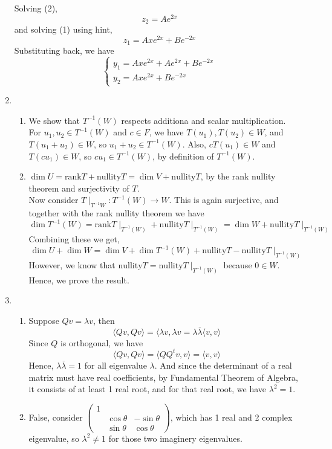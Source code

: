 \documentclass[12pt]{article}
\newcommand{\nullity}{\mathrm{nullity }}
\newcommand{\rank}{\mathrm{rank }}
\theoremstyle{definition}
\begin{document}
\begin{enumerate}
\[\]
Solving (2),
\[
z_2 = Ae^{2x}
\]
and solving (1) using hint, 
\[
z_1 = Axe^{2x}+Be^{-2x}
\]
Substituting back, we have
\[
\begin{cases}
y_1 = Axe^{2x}+Ae^{2x}+Be^{-2x}\\
y_2 = Axe^{2x}+Be^{-2x}
\end{cases}
\]
\item \begin{enumerate}
\item We show that $T^{-1}(W)$ respects additiona and scalar multiplication. \\For $u_1,u_2\in T^{-1}(W)$ and $c\in F$, we have $T(u_1),T(u_2)\in W$, and $T(u_1+u_2)\in W$, so $u_1+u_2\in T^{-1}(W)$. Also, $cT(u_1)\in W$ and $T(cu_1)\in W$, so $cu_1\in T^{-1}(W)$, by definition of $T^{-1}(W)$.
\item $\dim U = \rank T + \nullity T = \dim V + \nullity T$, by the rank nullity theorem and surjectivity of $T$.\\Now consider $T\mid_{T^{-1}W}:T^{-1}(W)\to W$. This is again surjective, and together with the rank nullity theorem we have
\[
\dim T^{-1}(W) = \rank T\mid_{T^{-1}(W)}+\nullity T\mid_{T^{-1}(W)} = \dim W +\nullity T\mid_{T^{-1}(W)}
\]
Combining these we get,
\[
\dim U + \dim W = \dim V + \dim T^{-1}(W) +\nullity T - \nullity T\mid_{T^{-1}(W)}
\]
However, we know that $\nullity T = \nullity T\mid_{T^{-1}(W)}$ because $0\in W$. Hence, we prove the result. 
\end{enumerate}
\item\begin{enumerate}
\item Suppose $Qv = \lambda v$, then
\[\langle Qv,Qv\rangle = \langle \lambda v, \lambda v =\lambda\overline{\lambda}\langle v,v\rangle
\]
Since $Q$ is orthogonal, we have
\[
\langle Qv,Qv\rangle = \langle QQ^t v,v\rangle = \langle v,v\rangle
\]
Hence, $\lambda\overline{\lambda}=1$ for all eigenvalue $\lambda$. And since the determinant of a real matrix must have real coefficients, by Fundamental Theorem of Algebra, it consists of at least 1 real root, and for that real root, we have $\lambda^2 = 1$.
\item False, consider $\begin{pmatrix}1&&\\&\cos\theta &-\sin\theta\\&\sin\theta&\cos\theta\end{pmatrix}$, which has 1 real and 2 complex eigenvalue, so $\lambda^2 \neq 1$ for those two imaginery eigenvalues.
\end{enumerate}

\end{enumerate}
\end{document}
